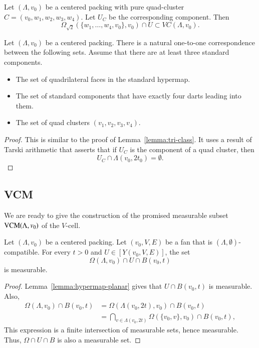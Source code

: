 \begin{lemma}
Let $(\Lambda,v_0)$ be a centered packing with pure quad-cluster $C=(v_0,w_1,w_2,w_3,w_4)$.  Let $U_C$ be the corresponding component.
Then
  $$
  \Omega_{\sqrt2}(\{w_1,\ldots,w_4,v_0\},v_0) \cap U \subset 
  VC(\Lambda,v_0).
  $$
\end{lemma}

\begin{lemma} Let $(\Lambda,v_0)$ be  a centered packing.
There is a natural one-to-one correspondence between the following
sets.  Assume that there are at least three standard components.
\begin{itemize}
  \item The set of quadrilateral faces in the standard hypermap.
  \item The set of standard components that have  exactly
    four darts leading into them.
  \item The set of quad clusters $(v_1,v_2,v_3,v_4)$.
\end{itemize}
\end{lemma}

\begin{proof} This is similar to the proof of Lemma~\ref{lemma:tri-class}.
It uses a result of Tarski arithmetic 
that asserts that if $U_C$ is
the component of a quad cluster, then
   $$U_C \cap \Lambda(v_0,2t_0) = \emptyset.$$
\end{proof}




\subsection{VCM}
\label{sec:VCM}

We are ready to give 
the construction of the promised measurable subset ${\operatorname{VCM}}(\Lambda,v_0)$ of the $V$-cell.


\begin{lemma}
Let $(\Lambda,v_0)$ be a centered packing.  Let $(v_0,V,E)$ be a fan
that is $(\Lambda,\emptyset)$-compatible.  For every $t>0$ and
$U\in[Y(v_0,V,E)]$, the set
  $$
  \Omega(\Lambda,v_0)\cap U \cap B(v_0,t)
  $$
is measurable.
\end{lemma}

\begin{proof}  Lemma~\ref{lemma:hypermap-planar} 
gives that $U\cap B(v_0,t)$ is measurable.
Also,
  $$
  \begin{array}{lll}
  \Omega(\Lambda,v_0)\cap B(v_0,t) &= \Omega(\Lambda(v_0,2t),v_0) 
    \cap B(v_0,t) \\
    &= \bigcap _{v\in\Lambda(v_0,2t)} \Omega(\{v_0,v\},v_0) \cap B(v_0,t),
  \end{array}
  $$
This expression is a finite
intersection of measurable sets, hence measurable.  Thus, $\Omega\cap U\cap B$ is also a measurable set.
\end{proof}

